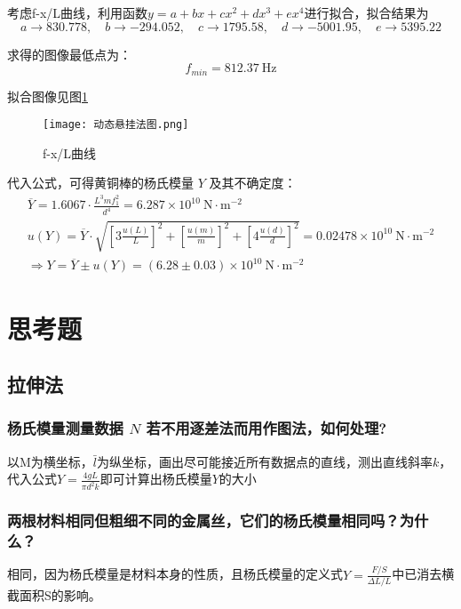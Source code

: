 \documentclass[11pt]{article}
\begin{document}
	考虑f-x/L曲线，利用函数$y=a + b x + c x^2 + d x^3 + e x^4$进行拟合，拟合结果为
	\[a \to 830.778, \quad b \to -294.052, \quad c \to 1795.58,\quad  d \to -5001.95, \quad e \to 5395.22\]
	
	求得的图像最低点为：
	\[f_{min}=812.37\ \mathrm{Hz}\]
	
	拟合图像见图\ref{fig:f-x/L}
	\begin{figure}[H]
		\centering
		\texttt{[image: 动态悬挂法图.png]}
		\caption{f-x/L曲线}
		\label{fig:f-x/L}
	\end{figure}
	
	代入公式，可得黄铜棒的杨氏模量 $Y$ 及其不确定度： 
	\begin{gather*}
		\overline{Y} = 1.6067 \cdot \frac{L^3 m f_1^2}{d^4} = 6.287 \times 10^{10} \ \mathrm{N\cdot m^{-2}} \\ 
		u(Y) = \overline{Y}\cdot \sqrt{
			\left[ 3 \frac{u(L)}{L} \right]^2 + 
			\left[ \frac{u(m)}{m} \right]^2 + 
			\left[ 4 \frac{u(d)}{d} \right]^2} = 0.02478 \times 10^{10} \ \mathrm{N\cdot m^{-2}} \\
		\Longrightarrow 
			Y = \overline{Y} \pm u(Y) = (6.28 \pm 0.03) \times 10^{10} \ \mathrm{N\cdot m^{-2}}
		\
	\end{gather*}
	
	
	\section{思考题}
	\subsection{拉伸法}
	\subsubsection{杨氏模量测量数据 $N$ 若不用逐差法而用作图法，如何处理?}
	以M为横坐标，$\bar{l}$为纵坐标，画出尽可能接近所有数据点的直线，测出直线斜率$k$，代入公式$Y=\frac{4gL}{\pi d^2 k}$即可计算出杨氏模量$Y$的大小
	\subsubsection{两根材料相同但粗细不同的金属丝，它们的杨氏模量相同吗？为什么？}
	相同，因为杨氏模量是材料本身的性质，且杨氏模量的定义式$Y=\frac{F/S}{\Delta L/L}$中已消去横截面积S的影响。
\end{document}
